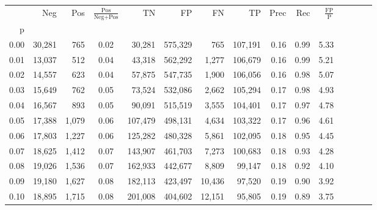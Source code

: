 \begin{tabular}{rrrcrrrrrrrrrrr}
\toprule
{} &     Neg &    Pos & $\frac{\text{Pos}}{\text{Neg}+\text{Pos}}$ &       TN &       FP &       FN &       TP &  Prec &   Rec & $\frac{\text{FP}}{\text{P}}$ \\
p    &         &        &                                            &          &          &          &          &       &       &                              \\
\midrule
0.00 &  30,281 &    765 &                                       0.02 &   30,281 &  575,329 &      765 &  107,191 &  0.16 &  0.99 &                         5.33 \\
0.01 &  13,037 &    512 &                                       0.04 &   43,318 &  562,292 &    1,277 &  106,679 &  0.16 &  0.99 &                         5.21 \\
0.02 &  14,557 &    623 &                                       0.04 &   57,875 &  547,735 &    1,900 &  106,056 &  0.16 &  0.98 &                         5.07 \\
0.03 &  15,649 &    762 &                                       0.05 &   73,524 &  532,086 &    2,662 &  105,294 &  0.17 &  0.98 &                         4.93 \\
0.04 &  16,567 &    893 &                                       0.05 &   90,091 &  515,519 &    3,555 &  104,401 &  0.17 &  0.97 &                         4.78 \\
0.05 &  17,388 &  1,079 &                                       0.06 &  107,479 &  498,131 &    4,634 &  103,322 &  0.17 &  0.96 &                         4.61 \\
0.06 &  17,803 &  1,227 &                                       0.06 &  125,282 &  480,328 &    5,861 &  102,095 &  0.18 &  0.95 &                         4.45 \\
0.07 &  18,625 &  1,412 &                                       0.07 &  143,907 &  461,703 &    7,273 &  100,683 &  0.18 &  0.93 &                         4.28 \\
0.08 &  19,026 &  1,536 &                                       0.07 &  162,933 &  442,677 &    8,809 &   99,147 &  0.18 &  0.92 &                         4.10 \\
0.09 &  19,180 &  1,627 &                                       0.08 &  182,113 &  423,497 &   10,436 &   97,520 &  0.19 &  0.90 &                         3.92 \\
0.10 &  18,895 &  1,715 &                                       0.08 &  201,008 &  404,602 &   12,151 &   95,805 &  0.19 &  0.89 &                         3.75 \\

\end{tabular}
